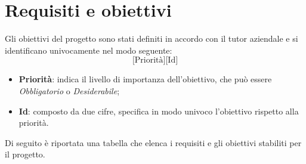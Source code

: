 \section{Requisiti e obiettivi}

Gli obiettivi del progetto sono stati definiti in accordo con il tutor aziendale e si identificano univocamente nel modo seguente:
\[
    \text{[Priorità][Id]}
\]
\begin{itemize}
    \item \textbf{Priorità}: indica il livello di importanza dell'obiettivo, che può essere \emph{Obbligatorio} o \emph{Desiderabile};
    \item \textbf{Id}: composto da due cifre, specifica in modo univoco l'obiettivo rispetto alla priorità.
\end{itemize}

Di seguito è riportata una tabella che elenca i requisiti e gli obiettivi stabiliti per il progetto.


